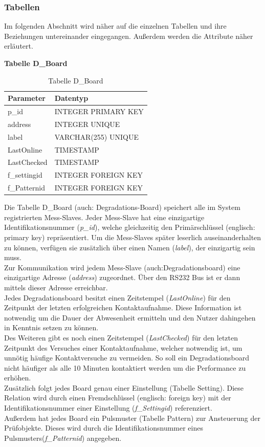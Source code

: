 \subsubsection{Tabellen}
Im folgenden Abschnitt wird näher auf die einzelnen Tabellen und ihre Beziehungen untereinander eingegangen. Außerdem werden die Attribute näher erläutert.

\newpage
\textbf{Tabelle D\_Board}\\

\begin{table}[H]
\begin{center}
\begin{tabular}{|l|l|}\hline
Parameter & Datentyp \\ \hline
p\_id & INTEGER PRIMARY KEY\\ 
address & INTEGER UNIQUE\\ 
label & VARCHAR(255) UNIQUE\\ 
LastOnline & TIMESTAMP\\ 
LastChecked & TIMESTAMP\\ 
f\_settingid & INTEGER FOREIGN KEY\\
f\_Patternid & INTEGER FOREIGN KEY\\ \hline
\end{tabular}
\caption{Tabelle D\_Board}
\label{table_TabelleD_Board}
\end{center}
\end{table}


Die Tabelle D\_Board (auch: Degradations-Board) speichert alle im System registrierten Mess-Slaves. Jeder Mess-Slave hat eine einzigartige Identifikationsnummer (\textit{p\_id}), welche gleichzeitig den Primärschlüssel (englisch: primary key) repräsentiert. Um die Mess-Slaves später leserlich auseinanderhalten zu können, verfügen sie zusätzlich über einen Namen (\textit{label}), der einzigartig sein muss.\\
Zur Kommunikation wird jedem Mess-Slave (auch:Degradationsboard) eine einzigartige Adresse (\textit{address}) zugeordnet. Über den RS232 Bus ist er dann mittels dieser Adresse erreichbar.\\
Jedes Degradationsboard besitzt einen Zeitstempel (\textit{LastOnline}) für den Zeitpunkt der letzten erfolgreichen Kontaktaufnahme. Diese Information ist notwendig um die Dauer der Abwesenheit ermitteln und den Nutzer dahingehen in Kenntnis setzen zu können.\\
Des Weiteren gibt es noch einen Zeitstempel (\textit{LastChecked}) für den letzten Zeitpunkt des Versuches einer Kontaktaufnahme, welcher notwendig ist, um unnötig häufige Kontaktversuche zu vermeiden. So soll ein Degradationsboard nicht häufiger als alle 10 Minuten kontaktiert werden um die Performance zu erhöhen.\\
Zusätzlich folgt jedes Board genau einer Einstellung (Tabelle Setting). Diese Relation wird durch einen Fremdschlüssel (englisch: foreign key) mit der Identifikationsnummer einer Einstellung (\textit{f\_Settingid}) referenziert.\\
Außerdem hat jedes Board ein Pulsmuster (Tabelle Pattern) zur Ansteuerung der Prüfobjekte. Dieses wird durch die Identifikationsnummer eines Pulsmusters(\textit{f\_Patternid}) angegeben.


